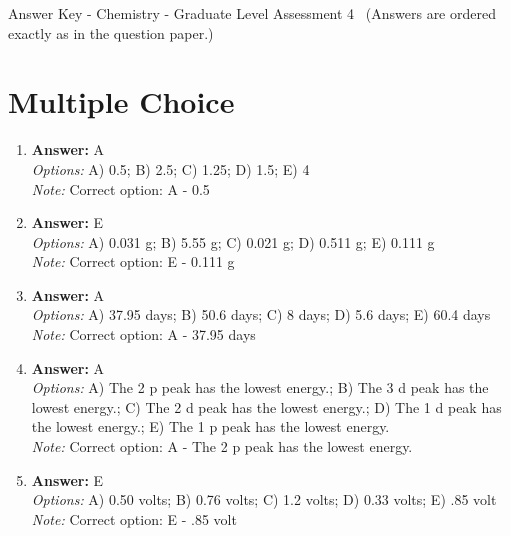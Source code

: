 \documentclass[12pt]{article}
\begin{document}
\begin{center}
Answer Key - Chemistry - Graduate Level Assessment 4 \
\small (Answers are ordered exactly as in the question paper.)
\end{center}

\section*{Multiple Choice}
\begin{enumerate}[label=\arabic*.]
\item \textbf{Answer:} A
\\ \textit{Options:} A) 0.5; B) 2.5; C) 1.25; D) 1.5; E) 4
\\ \textit{Note:} Correct option: A - 0.5
\item \textbf{Answer:} E
\\ \textit{Options:} A) 0.031 g; B) 5.55 g; C) 0.021 g; D) 0.511 g; E) 0.111 g
\\ \textit{Note:} Correct option: E - 0.111 g
\item \textbf{Answer:} A
\\ \textit{Options:} A) 37.95 days; B) 50.6 days; C) 8 days; D) 5.6 days; E) 60.4 days
\\ \textit{Note:} Correct option: A - 37.95 days
\item \textbf{Answer:} A
\\ \textit{Options:} A) The 2 p peak has the lowest energy.; B) The 3 d peak has the lowest energy.; C) The 2 d peak has the lowest energy.; D) The 1 d peak has the lowest energy.; E) The 1 p peak has the lowest energy.
\\ \textit{Note:} Correct option: A - The 2 p peak has the lowest energy.
\item \textbf{Answer:} E
\\ \textit{Options:} A) 0.50 volts; B) 0.76 volts; C) 1.2 volts; D) 0.33 volts; E) .85 volt
\\ \textit{Note:} Correct option: E - .85 volt
\end{enumerate}
\end{document}
